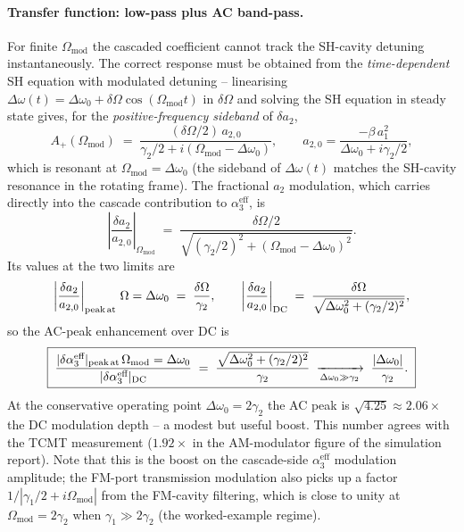 \documentclass[11pt,a4paper]{article}
\newcommand{\Dom}{\Delta\omega}
\begin{document}
\paragraph*{Transfer function: low-pass plus AC band-pass.}
For finite $\Omega_\text{mod}$ the cascaded coefficient cannot track
the SH-cavity detuning instantaneously.  The correct response must be
obtained from the \emph{time-dependent} SH equation with modulated
detuning -- linearising
$\Dom(t)=\Dom_0+\delta\Omega\cos(\Omega_\text{mod}t)$ in $\delta\Omega$
and solving the SH equation in steady state gives, for the
\emph{positive-frequency sideband} of $\delta a_2$,
\begin{equation}
  A_+(\Omega_\text{mod})
   \;=\;\frac{(\delta\Omega/2)\,a_{2,0}}{\gamma_2/2+i(\Omega_\text{mod}-\Dom_0)},
  \qquad a_{2,0}=\frac{-\beta\,a_1^{2}}{\Dom_0+i\gamma_2/2},
  \label{eq:H-modulator}
\end{equation}
which is resonant at $\Omega_\text{mod}=\Dom_0$ (the sideband of
$\Dom(t)$ matches the SH-cavity resonance in the rotating frame).
The fractional $a_2$ modulation, which carries directly into the
cascade contribution to $\alpha_3^\text{eff}$, is
\begin{equation}
  \left|\frac{\delta a_2}{a_{2,0}}\right|_{\Omega_\text{mod}}
   \;=\;\frac{\delta\Omega/2}{\sqrt{(\gamma_2/2)^{2}+(\Omega_\text{mod}-\Dom_0)^{2}}}.
\end{equation}
Its values at the two limits are
\begin{equation}
  \left|\frac{\delta a_2}{a_{2,0}}\right|_\text{peak\,at\,}\Omega=\Dom_0
   \;=\;\frac{\delta\Omega}{\gamma_2},
  \qquad
  \left|\frac{\delta a_2}{a_{2,0}}\right|_\text{DC}
   \;=\;\frac{\delta\Omega}{\sqrt{\Dom_0^{2}+(\gamma_2/2)^{2}}},
\end{equation}
so the AC-peak enhancement over DC is
\begin{equation}
  \boxed{\;
  \frac{|\delta\alpha_3^\text{eff}|_\text{peak\,at\,}\Omega_\text{mod}=\Dom_0}
       {|\delta\alpha_3^\text{eff}|_\text{DC}}
  \;=\;\frac{\sqrt{\Dom_0^{2}+(\gamma_2/2)^{2}}}{\gamma_2}
  \;\xrightarrow[\Dom_0\gg\gamma_2]{}\;\frac{|\Dom_0|}{\gamma_2}.\;}
  \label{eq:AC-peak-enhancement}
\end{equation}
At the conservative operating point $\Dom_0=2\gamma_2$ the AC peak is
$\sqrt{4.25}\approx 2.06\times$ the DC modulation depth -- a modest
but useful boost.  This number agrees with the TCMT measurement
($1.92\times$ in the AM-modulator figure of the simulation
report).  Note that this is the boost on the cascade-side
$\alpha_3^\text{eff}$ modulation amplitude; the FM-port transmission
modulation also picks up a factor $1/|\gamma_1/2 + i\Omega_\text{mod}|$
from the FM-cavity filtering, which is close to unity at
$\Omega_\text{mod}\!=\!2\gamma_2$ when $\gamma_1\gg 2\gamma_2$ (the
worked-example regime).
\end{document}
